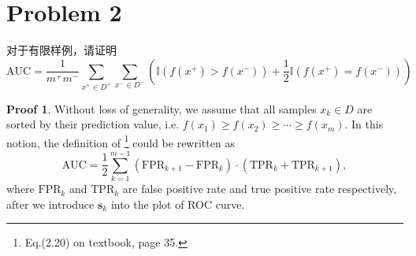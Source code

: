 \documentclass[a4paper,UTF8]{article}
\theoremstyle{definition}
\newtheorem*{prove}{Proof}
\begin{document}
\section*{Problem 2}
对于有限样例，请证明
\[
\text{AUC} = \frac{1}{m^+m^-}\sum_{x^+\in D^+}\sum_{x^-\in D^-}\left(\mathbb{I}(f(x^+)>f(x^-))+\frac{1}{2}\mathbb{I}(f(x^+)=f(x^-))\right)
\]

\begin{prove}
Without loss of generality, we assume that all samples $x_k\in D$ are sorted by their prediction value, i.e. $f(x_1)\geq f(x_2)\geq\cdots\geq f(x_m)$. In this notion, the definition of  \footnote{Eq.(2.20) on textbook, page 35.} could be rewritten as
\begin{equation}\label{auc_def}
\text{AUC} = \frac{1}{2}\sum_{k=1}^{m-1}(\text{FPR}_{k+1}-\text{FPR}_k)\cdot(\text{TPR}_{k}+\text{TPR}_{k+1}),
\end{equation}
where $\text{FPR}_k$ and $\text{TPR}_k$ are false positive rate and true positive rate respectively, after we introduce $\bm{s}_k$ into the plot of ROC curve.


\end{prove}
\end{document}
